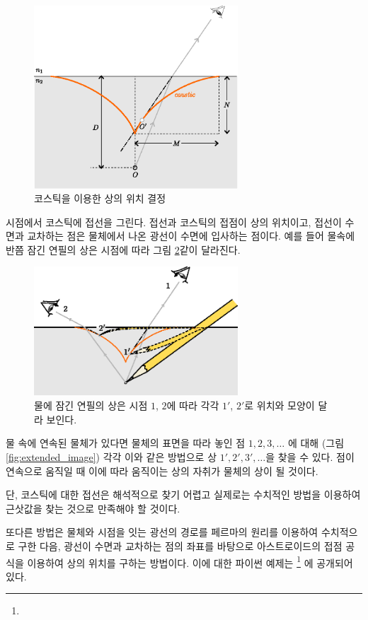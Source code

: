 \documentclass[twocolumn]{article}
\begin{document}
\begin{figure}[ht]
	\centering
	\includegraphics[width=3in]{figs/g394.eps}
	\caption{코스틱을 이용한 상의 위치 결정}
	\label{fig:image_caustic}
\end{figure}

시점에서 코스틱에 접선을 그린다. 접선과 코스틱의 접점이 상의 위치이고, 접선이 수면과 
교차하는 점은 물체에서 나온 광선이 수면에 입사하는 점이다. 
예를 들어 물속에 반쯤 잠긴 연필의 상은 시점에 따라 그림 \ref{fig:pencil_view}\과 같이 달라진다.
\begin{figure}[ht]
	\centering
	\includegraphics[width=3in]{figs/g43.eps}
	\caption{물에 잠긴 연필의 상은 시점 $1$, $2$에 따라 각각 $1'$, $2'$로 위치와 모양이 달라 보인다.}
	\label{fig:pencil_view}
\end{figure}

물 속에 연속된 물체가 있다면 물체의 표면을 따라 놓인 점 $1, 2, 3, \dots$ 에 대해 (그림 \ref{fig:extended_image})
각각 이와 같은 방법으로 상 $1', 2', 3', \dots$을 찾을 수 있다. 점이 연속으로 움직일 때 이에 따라 움직이는 상의 자취가 
물체의 상이 될 것이다.

단, 코스틱에 대한 접선은 해석적으로 찾기 어렵고 실제로는 수치적인 방법을 이용하여 
근삿값을 찾는 것으로 만족해야 할 것이다.

또다른 방법은 물체와 시점을 잇는 광선의 경로를 페르마의 원리를 이용하여 수치적으로 
구한 다음, 광선이 수면과 교차하는 점의 좌표를 바탕으로 아스트로이드의 접점 공식을 이용하여
상의 위치를 구하는 방법이다. 이에 대한 파이썬 예제는  
\href{https://github.com/mingshey/python_projects/blob/main/Refraction_Image.ipynb}%
{}\footnote{} 에 공개되어 있다.
\end{document}
